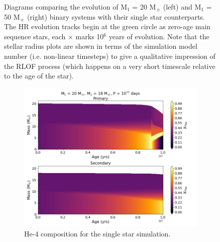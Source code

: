 \begin{figure}
\begin{subfigure}{\columnwidth}
        \label{subfig:50Msol_RLOF}
    \end{subfigure}
\caption{Diagrams comparing the evolution of M$_1$ = 20 M$_{\sun}$ (left) and M$_1$ = 50 M$_{\sun}$ (right) binary systems with their single star counterparts. The HR evolution tracks begin at the green circle as zero-age main sequence stars, each $\times$ marks 10$^6$ years of evolution. Note that the stellar radius plots are shown in terms of the simulation model number (i.e. non-linear timesteps) to give a qualitative impression of the RLOF process (which happens on a very short timescale relative to the age of the star).}
\label{fig:SinglevsBinary}
\end{figure}

\begin{figure}
    \centering
    \begin{subfigure}{\columnwidth}
        \includegraphics[width=\textwidth]{figures/results1/fig_He4_Age_M20_Sin.png}
        \captionsetup{width=.9\columnwidth}
        \caption{He-4 composition for the single star simulation.}
        \label{subfig:20Msol_He4_Sin}
    \end{subfigure}
    \begin{subfigure}{\columnwidth}

\end{subfigure}
\end{figure}
